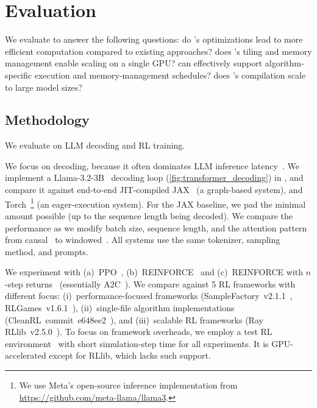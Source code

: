 
\section{Evaluation}
\label{sec:eval}

We evaluate \sys{} to answer the following questions: do \sys{}'s optimizations lead to more efficient computation compared to existing approaches? %
does \sys{}'s tiling and memory management enable scaling on a single GPU? %
can \sys{} effectively support algorithm-specific execution and memory-management schedules? %
does \sys{}'s compilation scale to large model sizes? %

\subsection{Methodology}
\label{sec:eval:methodology}

We evaluate \sys on LLM decoding and RL training.

 We focus on decoding, because it often dominates LLM inference latency~\cite{agrawal2024taming}. We implement a Llama-3.2-3B~\cite{dubey2024llama} decoding loop (\F\ref{fig:transformer_decoding}) in \sys{}, and compare it against end-to-end JIT-compiled JAX~\cite{frostig2018compiling} (a graph-based system), and Torch~\cite{paszke2019pytorch}\footnote{We use Meta's open-source inference implementation from \\\url{https://github.com/meta-llama/llama3}.} (an eager-execution system). For the JAX baseline, we pad the minimal amount possible (\ie up to the sequence length being decoded). We compare the performance as we modify batch size, sequence length, and the attention pattern from causal~\cite{vaswani2017attention} to windowed~\cite{zaheer2020big}. All systems use the same tokenizer, sampling method, and prompts.

 We experiment with (a)~PPO~\cite{schulman2017proximal}, (b)~REINFORCE~\cite{williams1992simple} and (c)~REINFORCE with $n$-step returns~\cite{sutton1988learning} (essentially A2C~\cite{mnih2016asynchronous}).
We compare \sys{} against 5 RL frameworks with different focus: (i)~performance-focused frameworks (SampleFactory~v2.1.1~\cite{Petrenko2020SampleFE}, RLGames~v1.6.1~\cite{rl-games2022}), (ii)~single-file algorithm implementations (CleanRL~commit~e648ee2~\cite{huang2022cleanrl}), and (iii)~scalable RL frameworks (Ray RLlib~v2.5.0~\cite{liang2018rllib}). To focus on framework overheads, we employ a test RL environment~\cite{freeman2021brax, makoviychuk2021isaac} with short simulation-step time for all experiments. It is GPU-accelerated except for RLlib, which lacks such support. %



